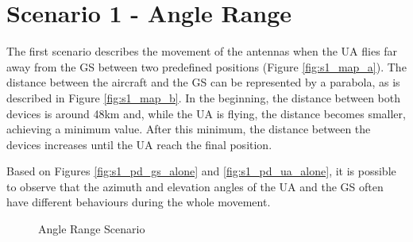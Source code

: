 \section{Scenario 1 - Angle Range}\label{sec:scenario1}
The first scenario describes the movement of the antennas when the UA flies far away from the GS between two predefined positions (Figure \ref{fig:s1_map_a}). The distance between the aircraft and the GS can be represented by a parabola, as is described in Figure \ref{fig:s1_map_b}. In the beginning, the distance between both devices is around 48km and, while the UA is flying, the distance becomes smaller, achieving a minimum value. After this minimum, the distance between the devices increases until the UA reach the final position.

Based on Figures \ref{fig:s1_pd_gs_alone} and \ref{fig:s1_pd_ua_alone}, it is possible to observe that the azimuth and elevation angles of the UA and the GS often have different behaviours during the whole movement. 
  

\begin{figure}[H]
	\hfill
	\hfill
	\hfill
	\caption{Angle Range Scenario}
	\label{fig:s1_map}
\end{figure}

